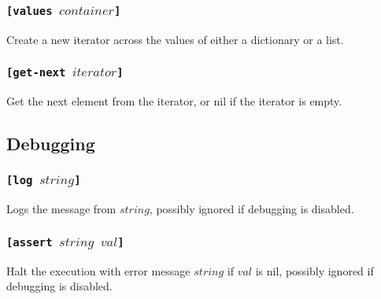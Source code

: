 \subsubsection{\tt{[values }$container$\tt{]}}
Create a new iterator across the values of either a dictionary or a list.
\subsubsection{\tt{[get-next }$iterator$\tt{]}}
Get the next element from the iterator, or nil if the iterator is empty.

\subsection{Debugging}
\subsubsection{\tt{[log }$string$\tt{]}}
Logs the message from $string$, possibly ignored if debugging is disabled.
\subsubsection{\tt{[assert }$string$ $val$\tt{]}}
Halt the execution with error message $string$ if $val$ is nil, possibly ignored if debugging is disabled.

